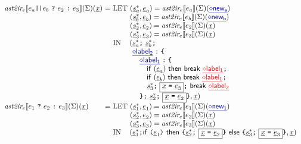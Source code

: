 \documentclass[a4paper, leqno]{amsart}
\newcommand{\newvar}[1]{\ensuremath{\underline{\sf \diamond{#1}}}}
\newcommand{\newva}{\newvar{new_1}}
\newcommand{\env}{\Sigma}
\newcommand{\open}{{\ingreen\langle}}
\newcommand{\atoi}{\ensuremath{\emph{ast2ir}}}
\newcommand{\atoiE}{\ensuremath{\atoi_e}}
\newcommand{\atoiEf}[2]{\ensuremath{\atoiE\lbr#1\rbr(#2)}}
\newcommand{\atoiEfd}[1]{\atoiEf{#1}{\env}}
\newcommand{\lbr}{\ensuremath{\llbracket}}
\newcommand{\rbr}{\ensuremath{\rrbracket}}
\def\inred{\color{red}}
\def\inblue{\color{blue}}
\def\ingreen{\color{green}}
\begin{document}
\[\begin{array}{l@{~}l@{~}l}
\atoiE\lbr e_a \verb+||+ e_b\ \verb+?+\ e_2\ \verb+:+\ e_3\rbr(\env)(\ir{x})
&=& \mbox{LET\ } (\irstmt_a^*, \irexpr_a) = \atoiEfd{e_a}({\inblue\newvar{new_a}})\\
& & \phantom{\mbox{LET\ }} (\irstmt_b^*, \irexpr_b) = \atoiEfd{e_b}({\inblue\newvar{new_b}})\\
& & \phantom{\mbox{LET\ }} (\irstmt_2^*, \irexpr_2) = \atoiEfd{e_2}(\ir{x})\\
& & \phantom{\mbox{LET\ }} (\irstmt_3^*, \irexpr_3) = \atoiEfd{e_3}(\ir{x})\\
& & \mbox{IN}\hspace*{1.2em}
(\irstmt_a^*\verb+;+\ \irstmt_b^*\verb+;+\\
& & \phantom{\mbox{IN}\hspace*{1.2em}\open}
{\inblue \newvar{label_2}} \; \verb+:+ \; \verb+{+\\
& & \phantom{\mbox{IN}\hspace*{1.2em}\open}\quad
{\inblue \newvar{label_1}} \; \verb+:+ \; \verb+{+\\
& & \phantom{\mbox{IN}\hspace*{1.2em}\open}\quad\quad
{\sf if\ (} {\irexpr_a} {\sf )\ then\ } {\sf break}\ {\inred\newvar{label_1}}\verb+;+\\
& & \phantom{\mbox{IN}\hspace*{1.2em}\open}\quad\quad
{\sf if\ (} {\irexpr_b} {\sf )\ then\ } {\sf break}\ {\inred\newvar{label_1}}\verb+;+\\
& & \phantom{\mbox{IN}\hspace*{1.2em}\open}\quad\quad
\irstmt_3^*\verb+;+ \ \fbox{\ir{x} {\tt =} $\irexpr_3$}\verb+;+\
{\sf break}\ {\inred\newvar{label_2}}\\
& & \phantom{\mbox{IN}\hspace*{1.2em}\open}\quad
\verb+};+\ \irstmt_2^*\verb+;+ \ \fbox{\ir{x} {\tt =} $\irexpr_2$}\verb+}+,\ir{x})\\


\atoiE\lbr e_1\ \verb+?+\ e_2\ \verb+:+\ e_3\rbr(\env)(\ir{x})
&=& \mbox{LET\ } (\irstmt_1^*, \irexpr_1) = \atoiEfd{e_1}({\inblue\newva})\\
& & \phantom{\mbox{LET\ }} (\irstmt_2^*, \irexpr_2) = \atoiEfd{e_2}(\ir{x})\\
& & \phantom{\mbox{LET\ }} (\irstmt_3^*, \irexpr_3) = \atoiEfd{e_3}(\ir{x})\\
& & \mbox{IN}\hspace*{1.2em}
(\irstmt_1^*\verb+;+
{\sf if} \ \verb+(+{\irexpr_1}\verb+)+ \
{\sf then} \ \verb+{+\irstmt_2^*\verb+;+ \ \fbox{\ir{x} {\tt =} $\irexpr_2$} \verb+}+\
{\sf else} \ \verb+{+\irstmt_3^*\verb+;+ \ \fbox{\ir{x} {\tt =} $\irexpr_3$} \verb+}+,
\ir{x})
\\

\end{array}
\]
\end{document}

